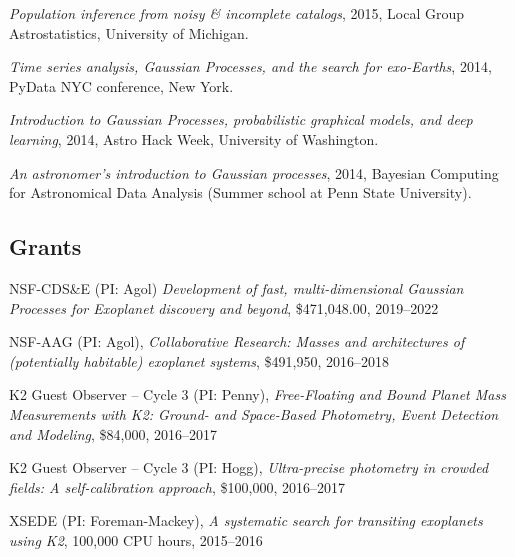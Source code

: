 \documentclass[12pt,letterpaper]{article}
\begin{document}
\begin{list}{}{\cvlist}
  \item \emph{Population inference from noisy \& incomplete catalogs}, 2015,
        Local Group Astrostatistics, University of Michigan.

  \item \emph{Time series analysis, Gaussian Processes, and the search for
          exo-Earths},
        2014, PyData NYC conference, New York.

  \item \emph{Introduction to Gaussian Processes, probabilistic graphical
          models, and deep learning},
        2014, Astro Hack Week, University of Washington.

  \item \emph{An astronomer's introduction to Gaussian processes},
        2014, Bayesian Computing for Astronomical Data Analysis (Summer school at
        Penn State University).

\end{list}

\subsection{Grants}
\begin{list}{}{\cvlist}
  \item NSF-CDS\&E (PI: Agol)
        \emph{Development of fast, multi-dimensional Gaussian Processes for Exoplanet discovery and beyond},
        \$471,048.00, 2019--2022

  \item
        NSF-AAG (PI: Agol),
        \emph{Collaborative Research: Masses and architectures of (potentially
          habitable) exoplanet systems},
        \$491,950, 2016--2018

  \item
        K2 Guest Observer -- Cycle 3 (PI: Penny),
        \emph{Free-Floating and Bound Planet Mass Measurements with K2: Ground- and
          Space-Based Photometry, Event Detection and Modeling},
        \$84,000, 2016--2017

  \item
        K2 Guest Observer -- Cycle 3 (PI: Hogg),
        \emph{Ultra-precise photometry in crowded fields: A self-calibration
          approach},
        \$100,000, 2016--2017

  \item
        XSEDE (PI: Foreman-Mackey),
        \emph{A systematic search for transiting exoplanets using K2},
        100,000 CPU hours, 2015--2016
\end{list}
\end{document}
